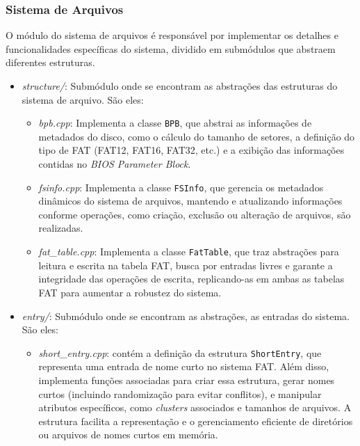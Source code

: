 \documentclass[
    12pt,				%
    oneside,   	        %
    a4paper,			%
    english,			%
    french,				%
    spanish,			%
    brazil,				%
    ]{pacotes/abntex2}
\begin{document}
\subsubsection{Sistema de Arquivos}
\label{subsubsec:fs}

O módulo do sistema de arquivos é responsável por implementar os detalhes e funcionalidades específicas do sistema, dividido em submódulos que abstraem diferentes estruturas. 

\begin{itemize} 
    \item \textit{structure/}: Submódulo onde se encontram as abstrações das estruturas do sistema de arquivo. São eles:
    \begin{itemize} 
        \item \textit{bpb.cpp}: Implementa a classe \texttt{BPB}, que abstrai as informações de metadados do disco, como o cálculo do tamanho de setores, a definição do tipo de FAT (FAT12, FAT16, FAT32, etc.) e a exibição das informações contidas no \textit{BIOS Parameter Block}. 
        
        \item \textit{fsinfo.cpp}: Implementa a classe \texttt{FSInfo}, que gerencia os metadados dinâmicos do sistema de arquivos, mantendo e atualizando informações conforme operações, como criação, exclusão ou alteração de arquivos, são realizadas. 
        
        \item \textit{fat\_table.cpp}: Implementa a classe \texttt{FatTable}, que traz abstrações para leitura e escrita na tabela FAT, busca por entradas livres e garante a integridade das operações de escrita, replicando-as em ambas as tabelas FAT para aumentar a robustez do sistema.
    \end{itemize}

    \item \textit{entry/}: Submódulo onde se encontram as abstrações, as entradas do sistema. São eles:
    \begin{itemize} 
        \item\textit{short\_entry.cpp}: contém a definição da estrutura \texttt{ShortEntry}, que representa uma entrada de nome curto no sistema FAT. Além disso, implementa funções associadas para criar essa estrutura, gerar nomes curtos (incluindo randomização para evitar conflitos), e manipular atributos específicos, como \textit{clusters} associados e tamanhos de arquivos. A estrutura facilita a representação e o gerenciamento eficiente de diretórios ou arquivos de nomes curtos em memória.


\end{itemize}
\end{itemize}
\end{document}
